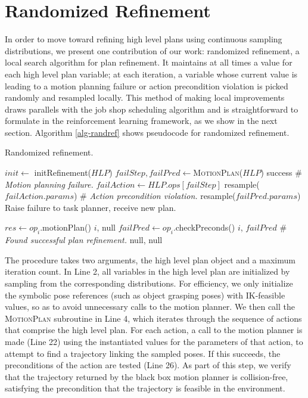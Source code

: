 \section{Randomized Refinement}
In order to move toward refining high level plans using continuous sampling distributions,
we present one contribution of our work: randomized refinement, a local search
algorithm for plan refinement. It maintains at all times a value for each high level plan
variable; at each iteration, a variable whose current value is leading to a motion planning failure or
action precondition violation is picked randomly and resampled locally. This method of making local improvements draws
parallels with the job shop scheduling algorithm and is straightforward to formulate
in the reinforcement learning framework, as we show in the next section.
Algorithm \ref{alg-randref} shows pseudocode for randomized refinement.

\begin{algorithm}
 \caption{Randomized refinement.} \label{alg-randref}
 \begin{algorithmic}[1]
  \State $init \leftarrow$ initRefinement($HLP$)
  \State $failStep, failPred \leftarrow $\textsc{MotionPlan}($HLP$)
  \State \Return success
  \Else
  \State \# \emph{Motion planning failure.}
  \State $failAction \leftarrow HLP.ops[failStep]$
  \State resample($failAction.params$)
  \Else
  \State \# \emph{Action precondition violation.}
  \State resample($failPred.params$)
  \EndIf
  \EndIf
  \EndFor
  \State Raise failure to task planner, receive new plan.
  \EndProcedure

  \State $res \leftarrow op_{i}$.motionPlan()
  \State \Return $i$, null
  \Else
  \State $failPred \leftarrow op_{i}$.checkPreconds()
  \State \Return $i$, $failPred$
  \Else
  \State \# \emph{Found successful plan refinement.}
  \State \Return null, null
  \EndIf
  \EndIf
  \EndFor
  \EndProcedure
 \end{algorithmic}
\end{algorithm}

The procedure takes two arguments, the high level plan object and a maximum
iteration count. In Line 2, all variables in the high level plan are initialized by sampling
from the corresponding distributions. For efficiency, we only initialize the symbolic pose
references (such as object grasping poses) with IK-feasible values, so as to avoid unnecessary calls to the
motion planner. We then call the \textsc{MotionPlan} subroutine in Line 4, which
iterates through the sequence of actions that comprise the high level plan.
For each action, a call to the motion planner is made (Line 22) using the instantiated values
for the parameters of that action, to attempt to find a trajectory
linking the sampled poses. If this succeeds, the preconditions of the action
are tested (Line 26). As part of this step, we verify that the trajectory returned by the
black box motion planner is collision-free, satisfying the precondition
that the trajectory is feasible in the environment.

